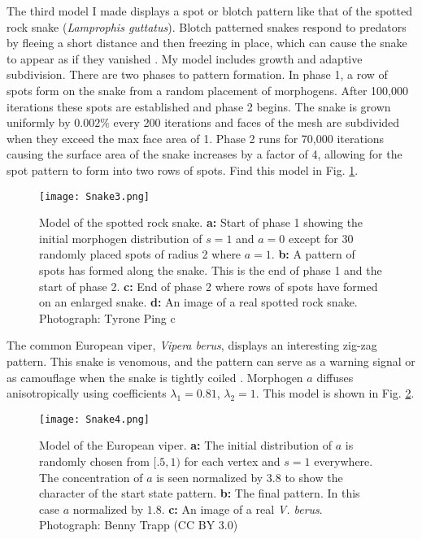 \newpage
The third model I made displays a spot or blotch pattern like that of the spotted rock snake (\textit{Lamprophis guttatus}). Blotch patterned snakes respond to predators by fleeing a short distance and then freezing in place, which can cause the snake to appear as if they vanished \citep{lillywhite2014}. 
My model includes growth and adaptive subdivision. There are two phases to pattern formation. In phase 1, a row of spots form on the snake from a random placement of morphogens. After 100,000 iterations these spots are established and phase 2 begins. The snake is grown uniformly by $0.002\%$ every 200 iterations and faces of the mesh are subdivided when they exceed the max face area of 1. Phase 2 runs for 70,000 iterations causing the surface area of the snake increases by a factor of 4, allowing for the spot pattern to form into two rows of spots. Find this model in Fig. \ref{fig:Snake3}.

\begin{figure}[ht]
	\centering
	\texttt{[image: Snake3.png]}
	\caption{Model of the spotted rock snake. \textbf{a:} Start of phase 1 showing the initial morphogen distribution of $s=1$ and $a=0$ except for 30 randomly placed spots of radius 2 where $a=1$. \textbf{b:} A pattern of spots has formed along the snake. This is the end of phase 1 and the start of phase 2. \textbf{c:} End of phase 2 where rows of spots have formed on an enlarged snake. \textbf{d:} An image of a real spotted rock snake. \textcolor{citation-gray}{Photograph: Tyrone Ping \textcircled{c}}}
	\label{fig:Snake3}
\end{figure}

\newpage
The common European viper, \textit{Vipera berus}, displays an interesting zig-zag pattern. This snake is venomous, and the pattern can serve as a warning signal or as camouflage when the snake is tightly coiled \citep{lillywhite2014}. Morphogen $a$ diffuses anisotropically using coefficients $\lambda_{1}=0.81$, $\lambda_{2}=1$. This model is shown in Fig. \ref{fig:Snake4}.

\begin{figure}[ht]
	\centering
	\texttt{[image: Snake4.png]}
	\caption{Model of the European viper. \textbf{a:} The initial distribution of $a$ is randomly chosen from $[.5, 1)$ for each vertex and $s=1$ everywhere. The concentration of $a$ is seen normalized by 3.8 to show the character of the start state pattern. \textbf{b:} The final pattern. In this case $a$ normalized by $1.8$. \textbf{c:} An image of a real \textit{V. berus}. \textcolor{citation-gray}{Photograph: Benny Trapp (CC BY 3.0)}}
	\label{fig:Snake4}
\end{figure}

